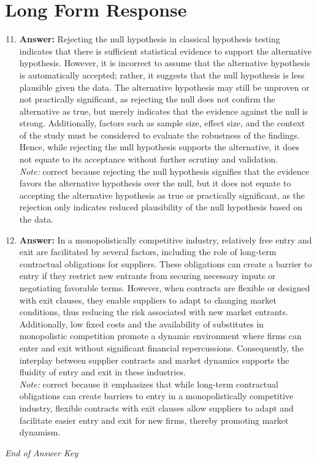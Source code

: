 \documentclass[12pt]{article}
\begin{document}
\section*{Long Form Response}
\begin{enumerate}[label=\arabic*.]
\setcounter{enumi}{10}
\item \textbf{Answer:} Rejecting the null hypothesis in classical hypothesis testing indicates that there is sufficient statistical evidence to support the alternative hypothesis. However, it is incorrect to assume that the alternative hypothesis is automatically accepted; rather, it suggests that the null hypothesis is less plausible given the data. The alternative hypothesis may still be unproven or not practically significant, as rejecting the null does not confirm the alternative as true, but merely indicates that the evidence against the null is strong. Additionally, factors such as sample size, effect size, and the context of the study must be considered to evaluate the robustness of the findings. Hence, while rejecting the null hypothesis supports the alternative, it does not equate to its acceptance without further scrutiny and validation.
\\ \textit{Note:} correct because rejecting the null hypothesis signifies that the evidence favors the alternative hypothesis over the null, but it does not equate to accepting the alternative hypothesis as true or practically significant, as the rejection only indicates reduced plausibility of the null hypothesis based on the data.
\item \textbf{Answer:} In a monopolistically competitive industry, relatively free entry and exit are facilitated by several factors, including the role of long-term contractual obligations for suppliers. These obligations can create a barrier to entry if they restrict new entrants from securing necessary inputs or negotiating favorable terms. However, when contracts are flexible or designed with exit clauses, they enable suppliers to adapt to changing market conditions, thus reducing the risk associated with new market entrants. Additionally, low fixed costs and the availability of substitutes in monopolistic competition promote a dynamic environment where firms can enter and exit without significant financial repercussions. Consequently, the interplay between supplier contracts and market dynamics supports the fluidity of entry and exit in these industries.
\\ \textit{Note:} correct because it emphasizes that while long-term contractual obligations can create barriers to entry in a monopolistically competitive industry, flexible contracts with exit clauses allow suppliers to adapt and facilitate easier entry and exit for new firms, thereby promoting market dynamism.
\end{enumerate}

\vfill
\noindent\textit{End of Answer Key}
\end{document}
